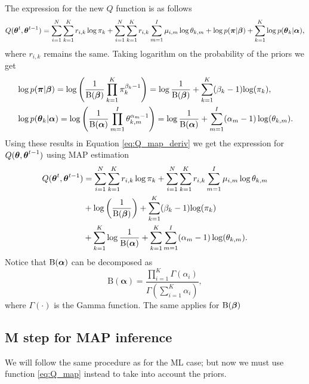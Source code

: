 \documentclass[12pt]{article}
\begin{document}
\noindent The expression for the new $Q$ function is as follows
\begin{equation}\label{eq:Q_map_deriv}
Q(\boldsymbol\theta^t, \boldsymbol\theta^{t-1}) = \sum_{i=1}^N\sum_{k=1}^K r_{i,k}\log \pi_k + \sum_{i=1}^N\sum_{k=1}^K r_{i,k}\sum_{m=1}^I \mu_{i,m}\log \theta_{k,m} + \log p(\boldsymbol\pi|\boldsymbol\beta) + \sum\limits_{k=1}^{K}\log p(\boldsymbol\theta_k|\boldsymbol\alpha),
\end{equation}
where $r_{i,k}$ remains the same. Taking logarithm on the probability of the priors we get
\begin{align}
& \log p(\boldsymbol\pi|\boldsymbol\beta) = \log \left (\dfrac{1}{\text{B}(\boldsymbol\beta)} \prod \limits_{k=1}^{K} \pi_{k}^{\beta_{k}-1} \right )= \log \dfrac{1}{\text{B}(\boldsymbol\beta)} + \sum \limits_{k=1}^{K}(\beta_{k}-1)\text{log}(\pi_{k}),\\
& \log p(\boldsymbol\theta_{k}|\boldsymbol\alpha) = \log \left(\dfrac{1}{\text{B}(\boldsymbol\alpha)} \prod \limits_{m=1}^{I} \theta_{k,m}^{\alpha_{m}-1}\right) = \log \dfrac{1}{\text{B}(\boldsymbol\alpha)} +  \sum \limits_{m=1}^{I}(\alpha_{m}-1)\log (\theta_{k,m}).
\end{align}
\noindent Using these results in Equation \ref{eq:Q_map_deriv} we get the expression for $Q(\boldsymbol\theta,\boldsymbol\theta^{t-1})$ using MAP estimation
\begin{align}\label{eq:Q_map}
Q(\boldsymbol\theta^t, \boldsymbol\theta^{t-1})& = \sum_{i=1}^N\sum_{k=1}^K r_{i,k}\log \pi_k + \sum_{i=1}^N\sum_{k=1}^K r_{i,k}\sum_{m=1}^I \mu_{i,m}\log \theta_{k,m} \\
& + \log \left(\dfrac{1}{\text{B}(\boldsymbol\beta)}\right) + \sum \limits_{k=1}^{K}(\beta_{k}-1)\text{log}(\pi_{k})\\
& + \sum\limits_{k=1}^{K} \log \dfrac{1}{\text{B}(\boldsymbol\alpha)} +  \sum\limits_{k=1}^{K}\sum \limits_{m=1}^{I}(\alpha_{m}-1)\log (\theta_{k,m}).
\end{align}
Notice that $\text{B}(\boldsymbol\alpha)$ can be decomposed as $$
\mathrm { B } ( \boldsymbol { \alpha } ) = \frac { \prod _ { i = 1 } ^ { K } \Gamma \left( \alpha _ { i } \right) } { \Gamma \left( \sum _ { i = 1 } ^ { K } \alpha _ { i } \right) },
$$
where $\Gamma(\cdot)$ is the Gamma function. The same applies for $\text{B}(\boldsymbol\beta)$


\subsection{M step for MAP inference}

\noindent We will follow the same procedure as for the ML case; but now we must use function \ref{eq:Q_map} instead to take into account the priors.
\end{document}
